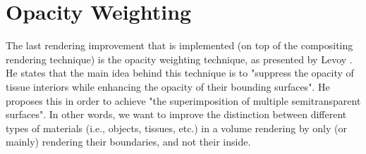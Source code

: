 

\section{Opacity Weighting}\label{sec:opacity}
The last rendering improvement that is implemented (on top of the compositing rendering technique) is the opacity weighting technique, as presented by Levoy \cite{levoy1988display}. He states that the main idea behind this technique is to "suppress the opacity of tissue interiors while enhancing the opacity of their bounding surfaces". He proposes this in order to achieve "the superimposition of multiple semitransparent surfaces". In other words, we want to improve the distinction between different types of materials (i.e., objects, tissues, etc.) in a volume rendering by only (or mainly) rendering their boundaries, and not their inside.

